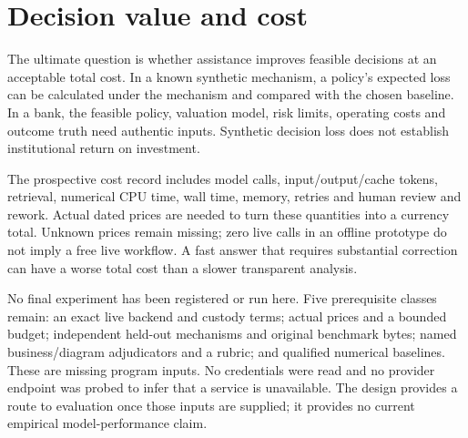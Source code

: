 \section{Decision value and cost}

The ultimate question is whether assistance improves feasible decisions at
an acceptable total cost. In a known synthetic mechanism, a policy's expected
loss can be calculated under the mechanism and compared with the chosen
baseline. In a bank, the feasible policy, valuation model, risk limits,
operating costs and outcome truth need authentic inputs. Synthetic decision
loss does not establish institutional return on investment.

The prospective cost record includes model calls, input/output/cache tokens,
retrieval, numerical CPU time, wall time, memory, retries and human review
and rework. Actual dated prices are needed to turn these quantities into a
currency total. Unknown prices remain missing; zero live calls in an offline
prototype do not imply a free live workflow. A fast answer that requires
substantial correction can have a worse total cost than a slower transparent
analysis.

No final experiment has been registered or run here. Five prerequisite
classes remain: an exact live backend and custody terms; actual prices and
a bounded budget; independent held-out mechanisms and original benchmark
bytes; named business/diagram adjudicators and a rubric; and qualified
numerical baselines. These are missing program inputs. No credentials were
read and no provider endpoint was probed to infer that a service is unavailable.
The design provides a route to evaluation once those inputs are supplied;
it provides no current empirical model-performance claim.

